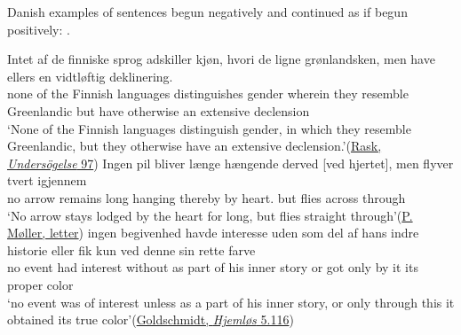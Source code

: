 Danish examples of sentences begun negatively and continued as if begun positively: .

\ea \label{ex:06-50}
\ea{}
 \gll Intet af de finniske sprog adskiller kjøn, hvori de ligne grønlandsken, men have ellers en vidtløftig deklinering.\\
 none of the Finnish languages distinguishes gender wherein they resemble Greenlandic but have otherwise an extensive declension\\
\glt `None of the Finnish languages distinguish gender, in which they resemble Greenlandic, but they otherwise have an extensive declension.'\hfill(\href{https://archive.org/details/undersgelseomde00raskgoog/page/n111/mode/2up?q=%22intet+af+de%22&view=theater}{Rask, \textit{Undersögelse} 97}) %
\ex {}
 \gll Ingen pil bliver længe hængende derved [ved hjertet], men flyver tvert igjennem\\
 no arrow remains long hanging thereby by heart.\DEF{} but flies across through\\
\glt `No arrow stays lodged by the heart for long, but flies straight through'\hfill(\href{https://archive.org/details/ChristianWintherEtLivsbillede/page/n209/mode/2up?view=theater&q=%22pil+bliver+l%C3%A6nge+h%C3%A6ngende%22}{P. Møller, letter}) %
\ex 
 \gll ingen begivenhed havde interesse uden som del af hans indre historie eller fik kun ved denne sin rette farve\\
 no event had interest without as part of his inner story or got only by it its proper color\\
\glt `no event was of interest unless as a part of his inner story, or only through this it obtained its true color'\hfill(\href{https://tekster.kb.dk/text/adl-texts-goldschmidt04-root#idm140467282407024}{Goldschmidt, \textit{Hjemløs} 5.116}) %

